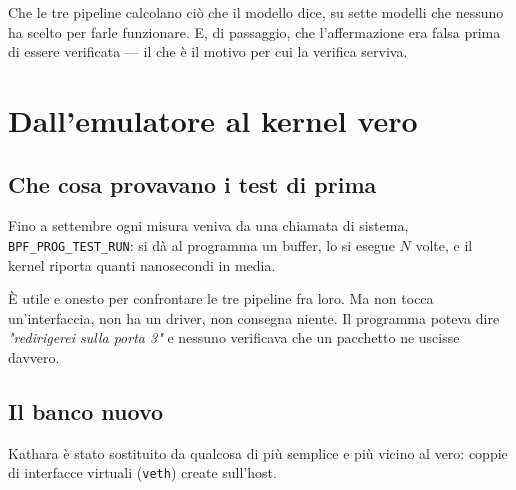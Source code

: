 \documentclass[11pt,a4paper,oneside]{report}
\begin{document}
Che le tre pipeline calcolano ciò che il modello dice, su sette modelli che
nessuno ha scelto per farle funzionare. E, di passaggio, che l'affermazione era
falsa prima di essere verificata --- il che è il motivo per cui la verifica
serviva.


\chapter{Dall'emulatore al kernel vero}

\section{Che cosa provavano i test di prima}

Fino a settembre ogni misura veniva da una chiamata di sistema,
\mbox{\texttt{BPF\_PROG\_TEST\_RUN}}: si dà al programma un buffer, lo si
esegue $N$ volte, e il kernel riporta quanti nanosecondi in media.

È utile e onesto per confrontare le tre pipeline fra loro. Ma non tocca
un'interfaccia, non ha un driver, non consegna niente. Il programma poteva dire
\emph{"redirigerei sulla porta 3"} e nessuno verificava che un pacchetto ne
uscisse davvero.

\section{Il banco nuovo}

Kathara è stato sostituito da qualcosa di più semplice e più vicino al vero:
coppie di interfacce virtuali (\texttt{veth}) create sull'host.

\begin{center}
\end{center}
\end{document}
